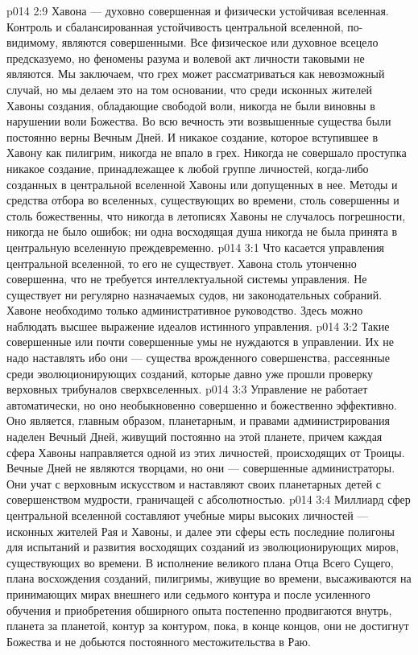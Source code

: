 \vs p014 2:9 \pc Хавона --- духовно совершенная и физически устойчивая вселенная. Контроль и сбалансированная устойчивость центральной вселенной, по\hyp{}видимому, являются совершенными. Все физическое или духовное всецело предсказуемо, но феномены разума и волевой акт личности таковыми не являются. Мы заключаем, что грех может рассматриваться как невозможный случай, но мы делаем это на том основании, что среди исконных жителей Хавоны создания, обладающие свободой воли, никогда не были виновны в нарушении воли Божества. Во всю вечность эти возвышенные существа были постоянно верны Вечным Дней. И никакое создание, которое вступившее в Хавону как пилигрим, никогда не впало в грех. Никогда не совершало проступка никакое создание, принадлежащее к любой группе личностей, когда\hyp{}либо созданных в центральной вселенной Хавоны или допущенных в нее. Методы и средства отбора во вселенных, существующих во времени, столь совершенны и столь божественны, что никогда в летописях Хавоны не случалось погрешности, никогда не было ошибок; ни одна восходящая душа никогда не была принята в центральную вселенную преждевременно.
\vs p014 3:1 Что касается управления центральной вселенной, то его не существует. Хавона столь утонченно совершенна, что не требуется интеллектуальной системы управления. Не существует ни регулярно назначаемых судов, ни законодательных собраний. Хавоне необходимо только административное руководство. Здесь можно наблюдать высшее выражение идеалов истинного управления.
\vs p014 3:2 Такие совершенные или почти совершенные умы не нуждаются в управлении. Их не надо наставлять ибо они --- существа врожденного совершенства, рассеянные среди эволюционирующих созданий, которые давно уже прошли проверку верховных трибуналов сверхвселенных.
\vs p014 3:3 Управление не работает автоматически, но оно необыкновенно совершенно и божественно эффективно. Оно является, главным образом, планетарным, и правами администрирования наделен Вечный Дней, живущий постоянно на этой планете, причем каждая сфера Хавоны направляется одной из этих личностей, происходящих от Троицы. Вечные Дней не являются творцами, но они --- совершенные администраторы. Они учат с верховным искусством и наставляют своих планетарных детей с совершенством мудрости, граничащей с абсолютностью.
\vs p014 3:4 Миллиард сфер центральной вселенной составляют учебные миры высоких личностей --- исконных жителей Рая и Хавоны, и далее эти сферы есть последние полигоны для испытаний и развития восходящих созданий из эволюционирующих миров, существующих во времени. В исполнение великого плана Отца Всего Сущего, плана восхождения созданий, пилигримы, живущие во времени, высаживаются на принимающих мирах внешнего или седьмого контура и после усиленного обучения и приобретения обширного опыта постепенно продвигаются внутрь, планета за планетой, контур за контуром, пока, в конце концов, они не достигнут Божества и не добьются постоянного местожительства в Раю.
